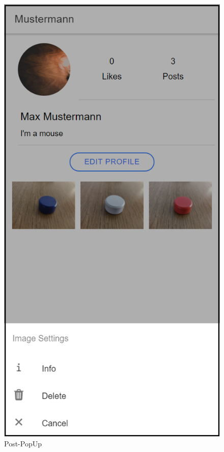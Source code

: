 \begin{figure}[H]
    \centering
    \begin{minipage}{.5\textwidth}
      \centering
      \includegraphics[width=.6\linewidth]{images/post_popup.png}
      \caption{Post-PopUp}
      \label{fig:post_popup}
    \end{minipage}%
    \begin{minipage}{.5\textwidth}
      \centering

\end{minipage}
\end{figure}
